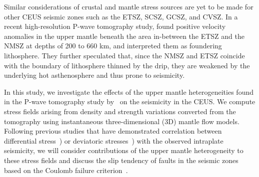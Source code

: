 \documentclass[draft,linenumbers]{agujournal2018}
\begin{document}
Similar considerations of crustal and mantle stress sources are yet to be made for other CEUS seismic zones such as the ETSZ, SCSZ, GCSZ, and CVSZ. In a recent high-resolution P-wave tomography study, \citet{Biryol_2016} found positive velocity anomalies in the upper mantle beneath the area in-between the ETSZ and the NMSZ at depths of 200 to 660 km, and interpreted them as foundering lithosphere. They further speculated that, since the NMSZ and ETSZ coincide with the boundary of lithosphere thinned by the drip, they are weakened by the underlying hot asthenosphere and thus prone to seismicity. 

In this study, we investigate the effects of the upper mantle heterogeneities found in the P-wave tomography study by~\citet{Biryol_2016} on the seismicity in the CEUS. We compute stress fields arising from density and strength variations converted from the tomography using instantaneous three-dimensional (3D) mantle flow models. %
Following previous studies that have demonstrated correlation between differential stress~\citep[e.g.,][]{baird2010relationship, zhan2016stress}) or deviatoric stresses~\citep[e.g.,][]{levandowski2016dense}) with the observed intraplate seismicity, 
we will consider contributions of the upper mantle heterogeneity to these stress fields and discuss the slip tendency of faults in the seismic zones based on the Coulomb failure criterion~\citep[e.g.,][]{king1994static, freed2005earthquake, li2007stress}. 
\end{document}
